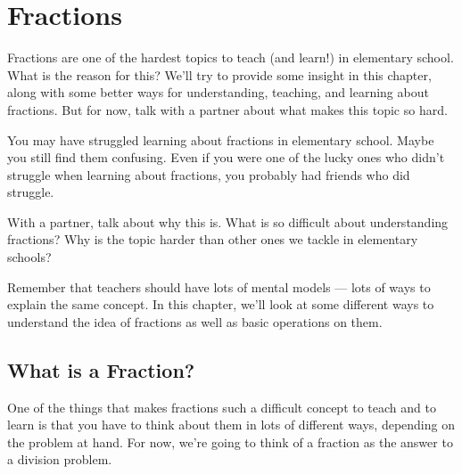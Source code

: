 
\chapter{Fractions}





Fractions are one of the hardest topics to teach (and learn!) in elementary school.  What is the reason for this?  We'll try to provide some insight in this chapter, along with some better ways for understanding, teaching, and learning about fractions.  But for now, talk with a partner about what makes this topic so hard.


\begin{thinkpair*}
You may have struggled learning about fractions in elementary school.  Maybe you still find them confusing.  Even if you were one of the lucky ones who didn't struggle when learning about fractions, you probably had friends who did struggle.

With a partner, talk about why this is.  What is so difficult about understanding fractions?  Why is the topic harder than other ones we tackle in elementary schools?
\end{thinkpair*}

Remember that teachers should have lots of mental models --- lots of ways to explain the same concept.  In this chapter, we'll look at some different ways to understand the idea of fractions as well as basic operations on them. 



\section{What is a Fraction?}
One of the things that makes fractions such a difficult concept to teach and to learn is that you have to think about them in lots of different ways, depending on the problem at hand.
For now, we're going to think of a fraction as the answer to a division problem.  


